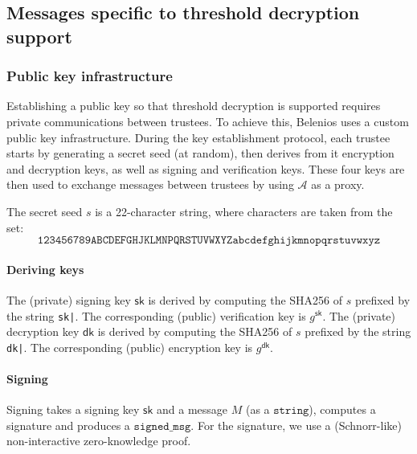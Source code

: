 \documentclass[a4paper]{article}
\newcommand{\jstring}{\texttt{string}}
\begin{document}
\subsection{Messages specific to threshold decryption support}
\label{threshold}

\subsubsection{Public key infrastructure}
\label{pki}

Establishing a public key so that threshold decryption is supported
requires private communications between trustees. To achieve this,
Belenios uses a custom public key infrastructure. During the key
establishment protocol, each trustee starts by generating a secret
seed (at random), then derives from it encryption and decryption keys,
as well as signing and verification keys. These four keys are then
used to exchange messages between trustees by using $\mathcal{A}$ as a proxy.

The secret seed $s$ is a 22-character string, where characters are
taken from the set:
\[\texttt{123456789ABCDEFGHJKLMNPQRSTUVWXYZabcdefghijkmnopqrstuvwxyz}\]

\paragraph{Deriving keys}

The (private) signing key $\textsf{sk}$ is derived by computing the
SHA256 of $s$ prefixed by the string \verb/sk|/. The corresponding
(public) verification key is $g^{\textsf{sk}}$. The (private)
decryption key $\textsf{dk}$ is derived by computing the SHA256 of $s$
prefixed by the string \verb/dk|/. The corresponding (public)
encryption key is $g^{\textsf{dk}}$.

\paragraph{Signing}

Signing takes a signing key $\textsf{sk}$ and a \textsf{message} $M$
(as a $\jstring$), computes a \textsf{signature} and produces a
$\texttt{signed\_msg}$. For the signature, we use a (Schnorr-like)
non-interactive zero-knowledge proof.
\end{document}
